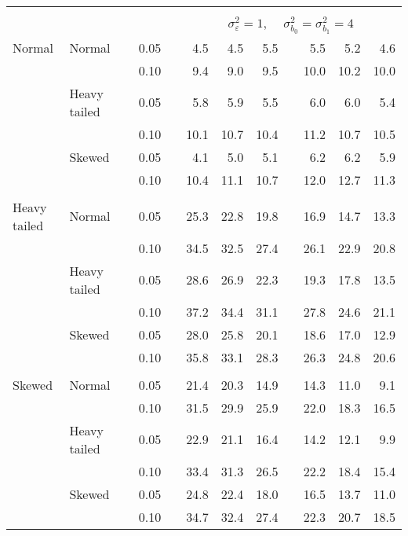 \begin{table}[ht]
\begin{scriptsize}
\begin{tabular}{ll p{.1cm} c p{.1cm} rrr p{.1cm} rrr}
&&&&&&&&&&&\\
& && && \multicolumn{7}{c}{$\sigma_{\varepsilon}^2 = 1$, \ \ $\sigma_{b_0}^2 = \sigma_{b_1}^2 = 4$} \\ \cline{6-12}
\rowcolor{gray!20} Normal & Normal &  & 0.05 &  & 4.5 & 4.5 & 5.5 &  & 5.5 & 5.2 & 4.6 \\ 
\rowcolor{gray!20}    &  &  & 0.10 &  & 9.4 & 9.0 & 9.5 &  & 10.0 & 10.2 & 10.0 \\ 
\rowcolor{gray!20}    & Heavy tailed &  & 0.05 &  & 5.8 & 5.9 & 5.5 &  & 6.0 & 6.0 & 5.4 \\ 
\rowcolor{gray!20}    &  &  & 0.10 &  & 10.1 & 10.7 & 10.4 &  & 11.2 & 10.7 & 10.5 \\ 
\rowcolor{gray!20}    & Skewed &  & 0.05 &  & 4.1 & 5.0 & 5.1 &  & 6.2 & 6.2 & 5.9 \\ 
\rowcolor{gray!20}    &  &  & 0.10 &  & 10.4 & 11.1 & 10.7 &  & 12.0 & 12.7 & 11.3 \\ 
&&&&&&&&&&&\\
  Heavy tailed & Normal &  & 0.05 &  & 25.3 & 22.8 & 19.8 &  & 16.9 & 14.7 & 13.3 \\ 
   &  &  & 0.10 &  & 34.5 & 32.5 & 27.4 &  & 26.1 & 22.9 & 20.8 \\ 
   & Heavy tailed &  & 0.05 &  & 28.6 & 26.9 & 22.3 &  & 19.3 & 17.8 & 13.5 \\ 
   &  &  & 0.10 &  & 37.2 & 34.4 & 31.1 &  & 27.8 & 24.6 & 21.1 \\ 
   & Skewed &  & 0.05 &  & 28.0 & 25.8 & 20.1 &  & 18.6 & 17.0 & 12.9 \\ 
   &  &  & 0.10 &  & 35.8 & 33.1 & 28.3 &  & 26.3 & 24.8 & 20.6 \\ 
&&&&&&&&&&&\\
  Skewed & Normal &  & 0.05 &  & 21.4 & 20.3 & 14.9 &  & 14.3 & 11.0 & 9.1 \\ 
   &  &  & 0.10 &  & 31.5 & 29.9 & 25.9 &  & 22.0 & 18.3 & 16.5 \\ 
   & Heavy tailed &  & 0.05 &  & 22.9 & 21.1 & 16.4 &  & 14.2 & 12.1 & 9.9 \\ 
   &  &  & 0.10 &  & 33.4 & 31.3 & 26.5 &  & 22.2 & 18.4 & 15.4 \\ 
   & Skewed &  & 0.05 &  & 24.8 & 22.4 & 18.0 &  & 16.5 & 13.7 & 11.0 \\ 
   &  &  & 0.10 &  & 34.7 & 32.4 & 27.4 &  & 22.3 & 20.7 & 18.5 \\ 


\hline
\end{tabular}
\end{scriptsize}
\end{table}




